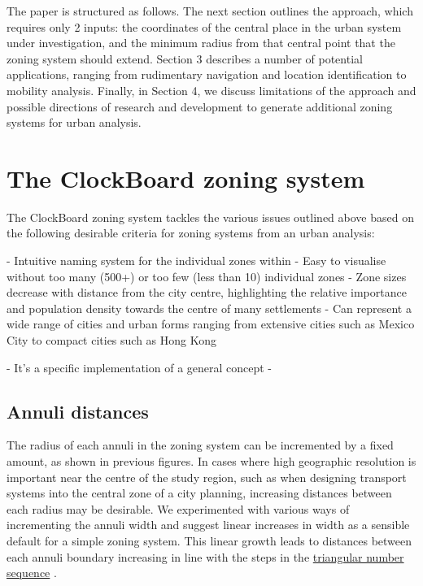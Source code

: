 \documentclass{josis}
\begin{document}
The paper is structured as follows.
The next section outlines the approach, which requires only 2 inputs: the coordinates of the central place in the urban system under investigation, and the minimum radius from that central point that the zoning system should extend.
Section 3 describes a number of potential applications, ranging from rudimentary navigation and location identification to mobility analysis.
Finally, in Section 4, we discuss limitations of the approach and possible directions of research and development to generate additional zoning systems for urban analysis.

\section{The ClockBoard zoning system}


The ClockBoard zoning system tackles the various issues outlined above based on the following desirable criteria for zoning systems from an urban analysis:

- Intuitive naming system for the individual zones within
- Easy to visualise without too many (500+) or too few (less than 10) individual zones
- Zone sizes decrease with distance from the city centre, highlighting the relative importance and population density towards the centre of many settlements
- Can represent a wide range of cities and urban forms ranging from extensive cities such as Mexico City to compact cities such as Hong Kong

- It's a specific implementation of a general concept
- 

\subsection{Annuli distances}

The radius of each annuli in the zoning system can be incremented by a fixed amount, as shown in previous figures. %
In cases where high geographic resolution is important near the centre of the study region, such as when designing transport systems into the central zone of a city planning, increasing distances between each radius may be desirable.
We experimented with various ways of incrementing the annuli width and suggest linear increases in width as a sensible default for a simple zoning system.
This linear growth leads to distances between each annuli boundary increasing in line with the steps in the \href{https://en.wikipedia.org/wiki/Triangular_number}{triangular number sequence} \cite{ross_dicuil_2019}.
\end{document}
